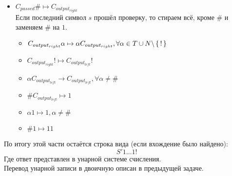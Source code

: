 \begin{itemize}
\begin{itemize}
            \item $C_{passed}\# \mapsto C_{output_{right}}$ \\
                Если последний символ $s$ прошёл проверку, то стираем всё, кроме $\#$ и заменяем $\#$ на $1$.
                \begin{itemize}
            \item $C_{output_{right}}\alpha \mapsto \alpha C_{output_{right}}, \forall \alpha \in T \cup N \backslash \set{!}$
            \item $C_{output_{right}}! \mapsto C_{output_{left}}!$
            \item $\alpha C_{output_{left}} \rightarrow C_{output_{left}}, \forall \alpha \neq \#$
            \item $\# C_{output_{left}} \mapsto 1$
            \item $\alpha 1 \mapsto 1, \alpha \neq \#$
            \item $ \# 1 \mapsto 1 1$
                \end{itemize}
        \end{itemize}
        По итогу этой части остаётся строка вида (если вхождение было найдено): 
        \[
        S' 1\ldots 1 !
        \]
        Где ответ представлен в унарной системе счисления. \\
        Перевод унарной записи в двоичную описан в предыдущей задаче.
\end{itemize}
